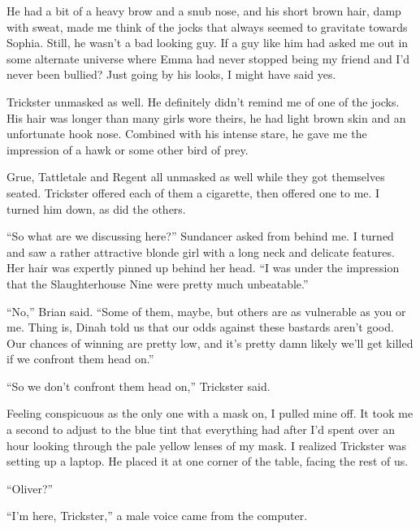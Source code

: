 He had a bit of a heavy brow and a snub nose, and his short brown hair, damp with sweat, made me think of the jocks that always seemed to gravitate towards Sophia.  Still, he wasn't a bad looking guy.  If a guy like him had asked me out in some alternate universe where Emma had never stopped being my friend and I'd never been bullied?  Just going by his looks, I might have said yes.



Trickster unmasked as well.  He definitely didn't remind me of one of the jocks.  His hair was longer than many girls wore theirs, he had light brown skin and an unfortunate hook nose.  Combined with his intense stare, he gave me the impression of a hawk or some other bird of prey.



Grue, Tattletale and Regent all unmasked as well while they got themselves seated.  Trickster offered each of them a cigarette, then offered one to me.  I turned him down, as did the others.



``So what are we discussing here?'' Sundancer asked from behind me.  I turned and saw a rather attractive blonde girl with a long neck and delicate features.  Her hair was expertly pinned up behind her head.  ``I was under the impression that the Slaughterhouse Nine were pretty much unbeatable.''



``No,'' Brian said.  ``Some of them, maybe, but others are as vulnerable as you or me.  Thing is, Dinah told us that our odds against these bastards aren't good.  Our chances of winning are pretty low, and it's pretty damn likely we'll get killed if we confront them head on.''



``So we don't confront them head on,'' Trickster said.



Feeling conspicuous as the only one with a mask on, I pulled mine off.  It took me a second to adjust to the blue tint that everything had after I'd spent over an hour looking through the pale yellow lenses of my mask.  I realized Trickster was setting up a laptop.  He placed it at one corner of the table, facing the rest of us.



``Oliver?''



``I'm here, Trickster,'' a male voice came from the computer.



